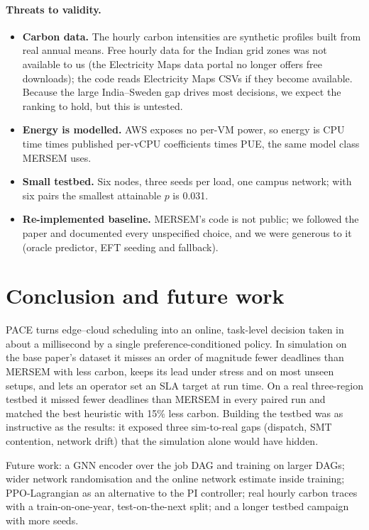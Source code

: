 \documentclass[11pt,a4paper]{article}
\begin{document}
\paragraph{Threats to validity.}
\begin{itemize}
\item \textbf{Carbon data.} The hourly carbon intensities are synthetic profiles built from real annual means. Free hourly data for the Indian grid zones was not available to us (the Electricity Maps data portal no longer offers free downloads); the code reads Electricity Maps CSVs if they become available. Because the large India--Sweden gap drives most decisions, we expect the ranking to hold, but this is untested.
\item \textbf{Energy is modelled.} AWS exposes no per-VM power, so energy is CPU time times published per-vCPU coefficients times PUE, the same model class MERSEM uses.
\item \textbf{Small testbed.} Six nodes, three seeds per load, one campus network; with six pairs the smallest attainable $p$ is 0.031.
\item \textbf{Re-implemented baseline.} MERSEM's code is not public; we followed the paper and documented every unspecified choice, and we were generous to it (oracle predictor, EFT seeding and fallback).
\end{itemize}

\section{Conclusion and future work}
PACE turns edge--cloud scheduling into an online, task-level decision taken in about a millisecond by a single preference-conditioned policy. In simulation on the base paper's dataset it misses an order of magnitude fewer deadlines than MERSEM with less carbon, keeps its lead under stress and on most unseen setups, and lets an operator set an SLA target at run time. On a real three-region testbed it missed fewer deadlines than MERSEM in every paired run and matched the best heuristic with 15\% less carbon. Building the testbed was as instructive as the results: it exposed three sim-to-real gaps (dispatch, SMT contention, network drift) that the simulation alone would have hidden.

Future work: a GNN encoder over the job DAG and training on larger DAGs; wider network randomisation and the online network estimate inside training; PPO-Lagrangian as an alternative to the PI controller; real hourly carbon traces with a train-on-one-year, test-on-the-next split; and a longer testbed campaign with more seeds.
\end{document}
